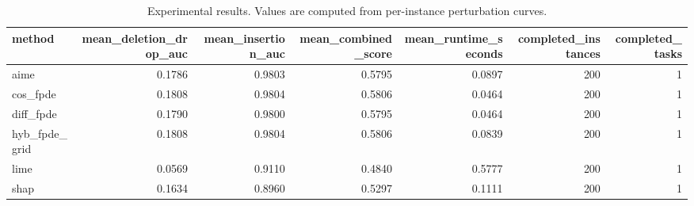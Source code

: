 \begin{table}[t]
\caption{Experimental results. Values are computed from per-instance perturbation curves.}
\label{tab:main_results_computed}
\centering
\begin{tabular}{lrrrrrr}
\toprule
method & mean\_deletion\_drop\_auc & mean\_insertion\_auc & mean\_combined\_score & mean\_runtime\_seconds & completed\_instances & completed\_tasks \\
\midrule
aime & 0.1786 & 0.9803 & 0.5795 & 0.0897 & 200 & 1 \\
cos\_fpde & 0.1808 & 0.9804 & 0.5806 & 0.0464 & 200 & 1 \\
diff\_fpde & 0.1790 & 0.9800 & 0.5795 & 0.0464 & 200 & 1 \\
hyb\_fpde\_grid & 0.1808 & 0.9804 & 0.5806 & 0.0839 & 200 & 1 \\
lime & 0.0569 & 0.9110 & 0.4840 & 0.5777 & 200 & 1 \\
shap & 0.1634 & 0.8960 & 0.5297 & 0.1111 & 200 & 1 \\
\bottomrule
\end{tabular}

\end{table}
